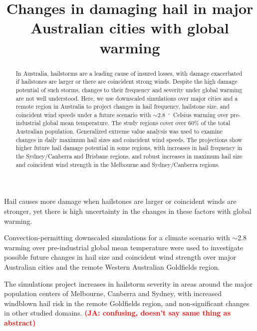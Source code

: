 \documentclass[]{agujournal2019}\usepackage[]{graphicx}\usepackage[]{xcolor}
\newcommand*{\todo}[1]{\textbf{\textcolor{red}{(#1)}}}
\begin{document}
\title{Changes in damaging hail in major Australian cities with global warming}




\begin{keypoints}
\item Hail causes more damage when hailstones are larger or coincident winds are
stronger, yet there is high uncertainty in the changes in these factors with
global warming.
\item Convection-permitting downscaled simulations for a climate scenario with
$\sim$2.8 warming over pre-industrial global mean temperature were used to
investigate possible future changes in hail size and coincident wind strength
over major Australian cities and the remote Western Australian Goldfields
region.
\item The simulations project increases in hailstorm severity in areas around
the major population centers of Melbourne, Canberra and Sydney, with increased
windblown hail risk in the remote Goldfields region, and non-significant changes
in other studied domains. \todo{JA: confusing, doesn't say same thing as
abstract}
\end{keypoints}

\begin{abstract} %
      In Australia, hailstorms are a leading cause of insured losses, with
      damage exacerbated if hailstones are larger or there are coincident strong
      winds. Despite the high damage potential of such storms, changes to their
      frequency and severity under global warming are not well understood. Here,
      we use downscaled simulations over major cities and a remote region in
      Australia to project changes in hail frequency, hailstone size, and
      coincident wind speeds under a future scenario with
      $\sim$2.8~$^{\circ{}}$~Celsius warming over pre-industrial global mean
      temperature. The study regions cover over 60\% of the total Australian
      population. Generalized extreme value analysis was used to examine changes
      in daily maximum hail sizes and coincident wind speeds. The projections
      show higher future hail damage potential in some regions, with increases
      in hail frequency in the Sydney/Canberra and Brisbane regions, and robust
      increases in maximum hail size and coincident wind strength in the
      Melbourne and Sydney/Canberra regions.
\end{abstract}
\end{document}
